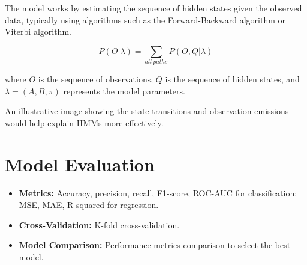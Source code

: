 The model works by estimating the sequence of hidden states given the observed data, typically using algorithms such as the Forward-Backward algorithm or Viterbi algorithm.

\[
P(O | \lambda) = \sum_{all \; paths} P(O, Q | \lambda)
\]

where $O$ is the sequence of observations, $Q$ is the sequence of hidden states, and $\lambda = (A, B, \pi)$ represents the model parameters.

An illustrative image showing the state transitions and observation emissions would help explain HMMs more effectively.


\section{Model Evaluation}
\begin{itemize}
    \item \textbf{Metrics:} Accuracy, precision, recall, F1-score, ROC-AUC for classification; MSE, MAE, R-squared for regression.
    \item \textbf{Cross-Validation:} K-fold cross-validation.
    \item \textbf{Model Comparison:} Performance metrics comparison to select the best model.
\end{itemize}
